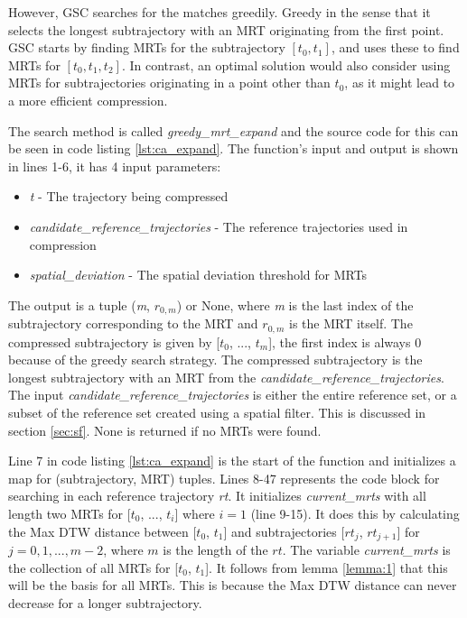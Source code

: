 However, GSC searches for the matches greedily. Greedy in the sense that it selects the longest subtrajectory with an MRT originating from the first point. GSC starts by finding MRTs for the subtrajectory $[t_0, t_1]$, and uses these to find MRTs for $[t_0, t_1, t_2]$. In contrast, an optimal solution would also consider using MRTs for subtrajectories originating in a point other than $t_0$, as it might lead to a more efficient compression.

The search method is called \textit{greedy\_mrt\_expand} and the source code for this can be seen in code listing \ref{lst:ca_expand}. The function's input and output is shown in lines 1-6, it has 4 input parameters:



\begin{itemize}
    \item{\textit{t} - The trajectory being compressed}
    \item{\textit{candidate\_reference\_trajectories} - The reference trajectories used in compression}
    \item{\textit{spatial\_deviation} - The spatial deviation threshold for MRTs}
\end{itemize}

The output is a tuple (\textit{m}, $r_{0,m}$) or None, where \textit{m} is the last index of the subtrajectory corresponding to the MRT and $r_{0,m}$ is the MRT itself. The compressed subtrajectory is given by [$t_0$, ..., $t_m$], the first index is always 0 because of the greedy search strategy. The compressed subtrajectory is the longest subtrajectory with an MRT from the \textit{candidate\_reference\_trajectories}. The input \textit{candidate\_reference\_trajectories} is either the entire reference set, or a subset of the reference set created using a spatial filter. This is discussed in section \ref{sec:sf}. None is returned if no MRTs were found.

Line 7 in code listing \ref{lst:ca_expand} is the start of the function and initializes a map for (subtrajectory, MRT) tuples. Lines 8-47 represents the code block for searching in each reference trajectory \textit{rt}. It initializes \textit{current\_mrts} with all length two MRTs for [$t_0$, ..., $t_i$] where $i = 1$ (line 9-15). It does this by calculating the Max DTW distance between [$t_0$, $t_1$] and subtrajectories [$rt_j$, $rt_{j+1}$] for $j = 0, 1, ..., m-2$, where $m$ is the length of the $rt$. The variable \textit{current\_mrts} is the collection of all MRTs for [$t_0$, $t_1$]. It follows from lemma \ref{lemma:1} that this will be the basis for all MRTs. This is because the Max DTW distance can never decrease for a longer subtrajectory.

